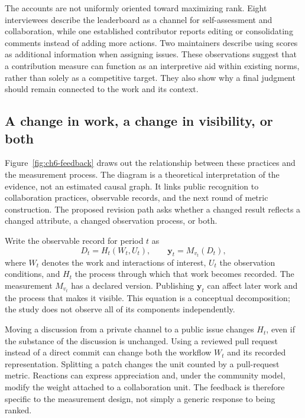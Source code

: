 The accounts are not uniformly oriented toward maximizing rank. Eight interviewees describe the leaderboard as a channel for self-assessment and collaboration, while one established contributor reports editing or consolidating comments instead of adding more actions. Two maintainers describe using scores as additional information when assigning issues. These observations suggest that a contribution measure can function as an interpretive aid within existing norms, rather than solely as a competitive target. They also show why a final judgment should remain connected to the work and its context.

\subsection{A change in work, a change in visibility, or both}
Figure~\ref{fig:ch6-feedback} draws out the relationship between these practices and the measurement process. The diagram is a theoretical interpretation of the evidence, not an estimated causal graph. It links public recognition to collaboration practices, observable records, and the next round of metric construction. The proposed revision path asks whether a changed result reflects a changed attribute, a changed observation process, or both.



Write the observable record for period \(t\) as
\begin{equation}
 D_t=H_t(W_t,U_t),\qquad
 \boldsymbol y_t=M_{v_t}(D_t),
 \label{eq:ch6-reflexive}
\end{equation}
where \(W_t\) denotes the work and interactions of interest, \(U_t\) the observation conditions, and \(H_t\) the process through which that work becomes recorded. The measurement \(M_{v_t}\) has a declared version. Publishing \(\boldsymbol y_t\) can affect later work and the process that makes it visible. This equation is a conceptual decomposition; the study does not observe all of its components independently.

Moving a discussion from a private channel to a public issue changes \(H_t\), even if the substance of the discussion is unchanged. Using a reviewed pull request instead of a direct commit can change both the workflow \(W_t\) and its recorded representation. Splitting a patch changes the unit counted by a pull-request metric. Reactions can express appreciation and, under the community model, modify the weight attached to a collaboration unit. The feedback is therefore specific to the measurement design, not simply a generic response to being ranked.

